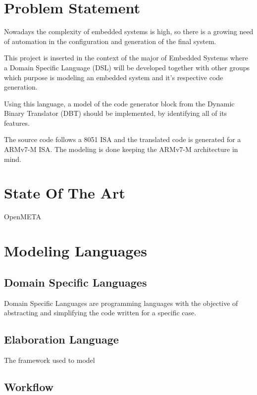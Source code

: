 \documentclass{report}
\begin{document}
	\section{Problem Statement}

	\par Nowadays the complexity of embedded systems is high, so there is a growing need of automation in the configuration and generation of the final system.
	\par This project is inserted in the context of the major of Embedded Systems where a Domain Specific Language (DSL) will be developed together with other groups which purpose is modeling an embedded system and it’s respective code generation. 
	\par Using this language, a model of the code generator block from the Dynamic Binary Translator (DBT) should be implemented, by identifying all of its features.
	\par The source code follows a 8051 ISA and the translated code is generated for a ARMv7-M ISA. The modeling is done keeping the ARMv7-M architecture in mind.

	\section{State Of The Art}

	\par OpenMETA

	\section{Modeling Languages}

		\subsection{Domain Specific Languages}
		
		\par Domain Specific Languages are programming languages with the objective of abstracting and simplifying the code written for a specific case.  

		\subsection{Elaboration Language}
		
		\par The framework used to model 

		\subsection{Workflow}
\end{document}
